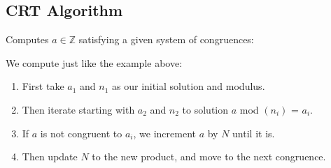 \newpage
\subsection{CRT Algorithm}
\begin{Func}
Computes \( a\in\mathbb{Z} \) satisfying a given system of congruences:

\begin{algorithm}[H]
    \SetAlgoLined
    \vspace{.5em}
\end{algorithm}
\end{Func}
We compute just like the example above:
\begin{enumerate}
    \item First take $a_1$ and $n_1$ as our initial solution and modulus.
    \item Then iterate starting with $a_2$ and $n_2$ to solution $a$ mod $(n_i)$ = $a_i$.
    \item If $a$ is not congruent to $a_i$, we increment $a$ by $N$ until it is.
    \item Then update $N$ to the new product, and move to the next congruence.
\end{enumerate}

    